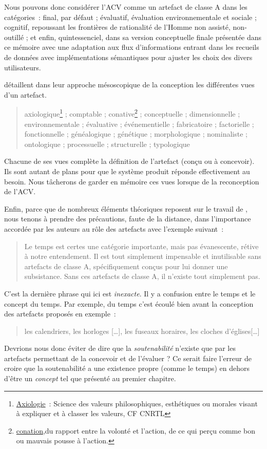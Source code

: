 Nous pouvons donc considérer l'\gls{ACV} comme un artefact de classe A dans les catégories~: final, par défaut ; évaluatif, évaluation environnementale et sociale ; cognitif, repoussant les frontières de rationalité de l'Homme non assisté, non-outillé ; et enfin, quintessenciel, dans sa version conceptuelle finale présentée dans ce mémoire avec une adaptation aux flux d'informations entrant dans les recueils de données avec implémentations sémantiques pour ajuster les choix des divers utilisateurs.

\citeauthor{micaelli_artificialisme:_2003} détaillent dans leur approche mésoscopique de la conception les différentes vues d'un artefact.
\blockcquote[p.132]{micaelli_artificialisme:_2003}{
	axiologique\footnote{\href{http://www.cnrtl.fr/definition/axiologie}{Axiologie}~: Science des valeurs philosophiques, esthétiques ou morales visant à expliquer et à classer les valeurs, CF CNRTL} ; comptable ; conative\footnote{\href{http://gdt.oqlf.gouv.qc.ca/resultat.aspx?terme=conation}{conation},du rapport entre la volonté et l'action, de ce qui perçu comme bon ou mauvais pousse à l'action.} ; conceptuelle ; dimensionnelle ; environnementale ; évaluative ; événementielle ; fabricatoire ; factorielle ; fonctionnelle ; généalogique ; génétique ; morphologique ; nominaliste ; ontologique ; processuelle ; structurelle ; typologique
}
Chacune de ses vues complète la définition de l'artefact (conçu ou à concevoir).
Ils sont autant de plans pour que le système produit réponde effectivement au besoin.
Nous tâcherons de garder en mémoire ces vues lorsque de la reconception de l'ACV.

Enfin, parce que de nombreux éléments théoriques reposent sur le travail de \citeauthor{micaelli_artificialisme:_2003}, nous tenons à prendre des précautions, faute de la distance, dans l'importance accordée par les auteurs au rôle des artefacts avec l'exemple suivant~:
\blockcquote[chapitre 4, p.59 4.2.2 Deuxième exemple: le temps]{micaelli_artificialisme:_2003}{
Le temps est certes une catégorie importante, mais pas évanescente, rétive à notre entendement.
Il est tout simplement impensable et inutilisable sans artefacts de classe A, spécifiquement conçus pour lui donner une subsistance.
Sans ces artefacts de classe A, il n'existe tout simplement pas.}
C'est la dernière phrase qui ici est \emph{inexacte}.
Il y a confusion entre le temps et le concept du temps.
Par exemple, du temps c'est écoulé bien avant la conception des artefacts proposés en exemple~:
\blockcquote[chapitre 4, p.59 4.2.2 Deuxième exemple: le temps]{micaelli_artificialisme:_2003}{
les calendriers, les horloges [\ldots], les fuseaux horaires, les cloches d'églises[\ldots]
}.
Devrions nous donc éviter de dire que la \emph{soutenabilité} n’existe que par les artefacts permettant de la concevoir et de l'évaluer ?
Ce serait faire l'erreur de croire que la soutenabilité a une existence propre (comme le temps) en dehors d’être un \emph{concept} tel que présenté au premier chapitre.

